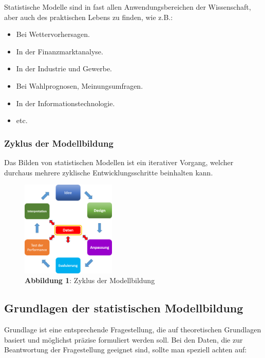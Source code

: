 \documentclass[]{article}
\providecommand{\tightlist}{%
  \setlength{\itemsep}{0pt}\setlength{\parskip}{0pt}}
\begin{document}
Statistische Modelle sind in fast allen Anwendungsbereichen der
Wissenschaft, aber auch des praktischen Lebens zu finden, wie z.B.:

\begin{itemize}
\tightlist
\item
  Bei Wettervorhersagen.
\item
  In der Finanzmarktanalyse.
\item
  In der Industrie und Gewerbe.
\item
  Bei Wahlprognosen, Meinungsumfragen.
\item
  In der Informationstechnologie.
\item
  etc.
\end{itemize}

\subsubsection*{Zyklus der
Modellbildung}\label{zyklus-der-modellbildung}

Das Bilden von statistischen Modellen ist ein iterativer Vorgang,
welcher durchaus mehrere zyklische Entwicklungsschritte beinhalten kann.

\begin{figure}
\centering
\includegraphics[width=0.40000\textwidth]{Images/ZyklusModellbildung.PNG}
\caption{\textbf{Abbildung 1}: Zyklus der Modellbildung}
\end{figure}

\subsection*{Grundlagen der statistischen
Modellbildung}\label{grundlagen-der-statistischen-modellbildung}

Grundlage ist eine entsprechende Fragestellung, die auf theoretischen
Grundlagen basiert und möglichst präzise formuliert werden soll. Bei den
Daten, die zur Beantwortung der Fragestellung geeignet sind, sollte man
speziell achten auf:
\end{document}
